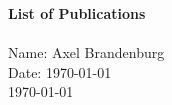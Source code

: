 \documentclass{article}
\begin{document}
\noindent
\LARGE
{\bf List of Publications}\\
\normalsize
\\
Name: Axel Brandenburg\\
Date: \today\\



\small\today\normalsize
\end{document}
